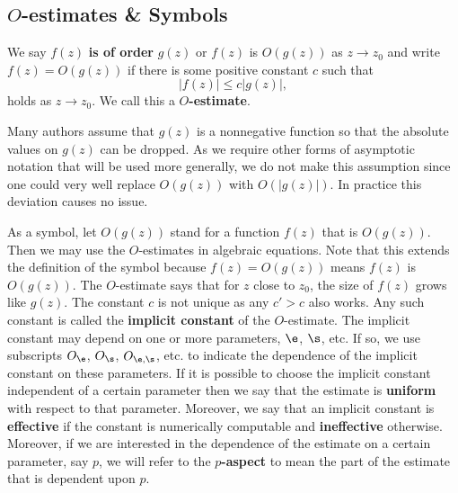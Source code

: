       \subsection*{\texorpdfstring{$O$}{O}-estimates \& Symbols}
        We say $f(z)$ \textbf{is of order} $g(z)$ or $f(z)$ is $O(g(z))$ as $z \to z_{0}$ and write $f(z) = O(g(z))$
        if there is some positive constant $c$ such that
        \[
          |f(z)| \le c|g(z)|,
        \]
        holds as $z \to z_{0}$. We call this a \textbf{$O$-estimate}.
        
        \begin{remark}
          Many authors assume that $g(z)$ is a nonnegative function so that the absolute values on $g(z)$ can be dropped. As we require other forms of asymptotic notation that will be used more generally, we do not make this assumption since one could very well replace $O(g(z))$ with $O(|g(z)|)$. In practice this deviation causes no issue.
        \end{remark}
        
        As a symbol, let $O(g(z))$ stand for a function $f(z)$ that is $O(g(z))$. Then we may use the $O$-estimates in algebraic equations. Note that this extends the definition of the symbol because $f(z) = O(g(z))$ means $f(z)$ is $O(g(z))$. The $O$-estimate says that for $z$ close to $z_{0}$, the size of $f(z)$ grows like $g(z)$. The constant $c$ is not unique as any $c' > c$ also works. Any such constant is called the \textbf{implicit constant} of the $O$-estimate. The implicit constant may depend on one or more parameters, $\e$, $\s$, etc. If so, we use subscripts $O_{\e}$, $O_{\s}$, $O_{\e,\s}$, etc. to indicate the dependence of the implicit constant on these parameters. If it is possible to choose the implicit constant independent of a certain parameter then we say that the estimate is \textbf{uniform} with respect to that parameter. Moreover, we say that an implicit constant is \textbf{effective} if the constant is numerically computable and \textbf{ineffective} otherwise. Moreover, if we are interested in the dependence of the estimate on a certain parameter, say $p$, we will refer to the \textbf{$p$-aspect} to mean the part of the estimate that is dependent upon $p$.

